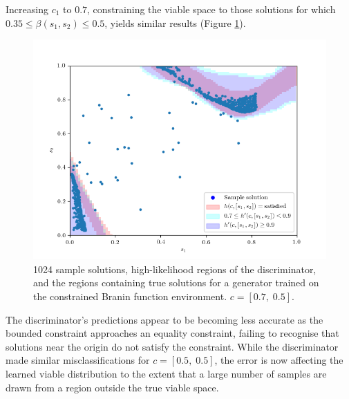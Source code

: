 \documentclass[../../main.tex]{subfiles}
\begin{document}
Increasing $c_1$ to $0.7$, constraining the viable space to those solutions for which $0.35\le\beta(s_1,s_2)\le0.5$, yields similar results (Figure \ref{fig:equality07}).
\begin{figure}[H]
    \begin{center}
    \includegraphics[width=\textwidth]{equality07}
    \caption{
        1024 sample solutions, high-likelihood regions of the discriminator, and the regions containing true solutions for a generator trained on the constrained Branin function environment.
        $c=[0.7,\;0.5]$.
    }
    \label{fig:equality07}
    \end{center}
\end{figure}
The discriminator's predictions appear to be becoming less accurate as the bounded constraint approaches an equality constraint, failing to recognise that solutions near the origin do not satisfy the constraint.
While the discriminator made similar misclassifications for $c=[0.5,\;0.5]$, the error is now affecting the learned viable distribution to the extent that a large number of samples are drawn from a region outside the true viable space.
\end{document}
